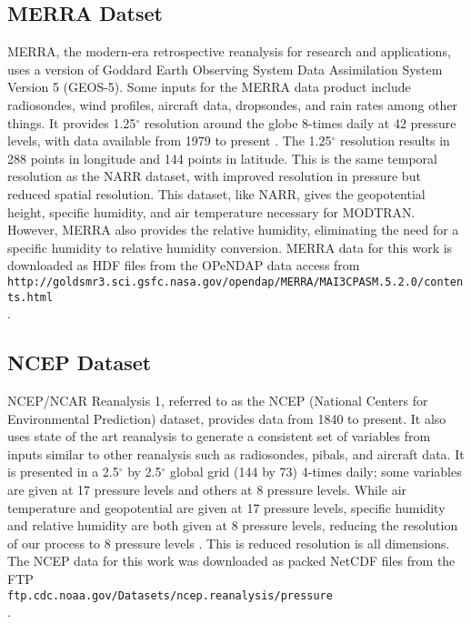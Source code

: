 \documentclass{book}
\begin{document}
\subsection{MERRA Datset}
\label{sec:merradataset}

MERRA, the modern-era retrospective reanalysis for research and applications, uses a version of Goddard Earth Observing System Data Assimilation System Version 5 (GEOS-5).  Some inputs for the MERRA data product include radiosondes, wind profiles, aircraft data, dropsondes, and rain rates among other things.  It provides 1.25$^\circ$ resolution around the globe 8-times daily at 42 pressure levels, with data available from 1979 to present \cite{merra}.  The 1.25$^\circ$ resolution results in 288 points in longitude and 144 points in latitude.  This is the same temporal resolution as the NARR dataset, with improved resolution in pressure but reduced spatial resolution.  This dataset, like NARR, gives the geopotential height, specific humidity, and air temperature necessary for MODTRAN.  However, MERRA also provides the relative humidity, eliminating the need for a specific humidity to relative humidity conversion.  MERRA data for this work is downloaded as HDF files from the OPeNDAP data access from \\ {\tt http://goldsmr3.sci.gsfc.nasa.gov/opendap/MERRA/MAI3CPASM.5.2.0/contents.html} \\ \cite{merra_data}.

\subsection{NCEP Dataset}
\label{sec:ncepdataset}

NCEP/NCAR Reanalysis 1, referred to as the NCEP (National Centers for Environmental Prediction) dataset, provides data from 1840 to present.  It also uses state of the art reanalysis to generate a consistent set of variables from inputs similar to other reanalysis such as radiosondes, pibals, and aircraft data.  It is presented in a 2.5$^\circ$ by 2.5$^\circ$ global grid (144 by 73) 4-times daily; some variables are given at 17 pressure levels and others at 8 pressure levels.  While air temperature and geopotential are given at 17 pressure levels, specific humidity and relative humidity are both given at 8 pressure levels, reducing the resolution of our process to 8 pressure levels \cite{ncep}.  This is reduced resolution is all dimensions.  The NCEP data for this work was downloaded as packed NetCDF files from the FTP \\ {\tt ftp.cdc.noaa.gov/Datasets/ncep.reanalysis/pressure} \\ \cite{ncep_data}.
\end{document}
